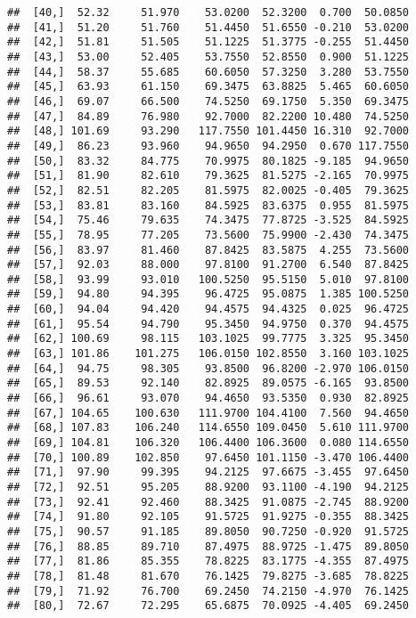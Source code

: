 \documentclass[
]{article}
\begin{document}
\begin{verbatim}
##  [40,]  52.32     51.970    53.0200  52.3200  0.700  50.0850
##  [41,]  51.20     51.760    51.4450  51.6550 -0.210  53.0200
##  [42,]  51.81     51.505    51.1225  51.3775 -0.255  51.4450
##  [43,]  53.00     52.405    53.7550  52.8550  0.900  51.1225
##  [44,]  58.37     55.685    60.6050  57.3250  3.280  53.7550
##  [45,]  63.93     61.150    69.3475  63.8825  5.465  60.6050
##  [46,]  69.07     66.500    74.5250  69.1750  5.350  69.3475
##  [47,]  84.89     76.980    92.7000  82.2200 10.480  74.5250
##  [48,] 101.69     93.290   117.7550 101.4450 16.310  92.7000
##  [49,]  86.23     93.960    94.9650  94.2950  0.670 117.7550
##  [50,]  83.32     84.775    70.9975  80.1825 -9.185  94.9650
##  [51,]  81.90     82.610    79.3625  81.5275 -2.165  70.9975
##  [52,]  82.51     82.205    81.5975  82.0025 -0.405  79.3625
##  [53,]  83.81     83.160    84.5925  83.6375  0.955  81.5975
##  [54,]  75.46     79.635    74.3475  77.8725 -3.525  84.5925
##  [55,]  78.95     77.205    73.5600  75.9900 -2.430  74.3475
##  [56,]  83.97     81.460    87.8425  83.5875  4.255  73.5600
##  [57,]  92.03     88.000    97.8100  91.2700  6.540  87.8425
##  [58,]  93.99     93.010   100.5250  95.5150  5.010  97.8100
##  [59,]  94.80     94.395    96.4725  95.0875  1.385 100.5250
##  [60,]  94.04     94.420    94.4575  94.4325  0.025  96.4725
##  [61,]  95.54     94.790    95.3450  94.9750  0.370  94.4575
##  [62,] 100.69     98.115   103.1025  99.7775  3.325  95.3450
##  [63,] 101.86    101.275   106.0150 102.8550  3.160 103.1025
##  [64,]  94.75     98.305    93.8500  96.8200 -2.970 106.0150
##  [65,]  89.53     92.140    82.8925  89.0575 -6.165  93.8500
##  [66,]  96.61     93.070    94.4650  93.5350  0.930  82.8925
##  [67,] 104.65    100.630   111.9700 104.4100  7.560  94.4650
##  [68,] 107.83    106.240   114.6550 109.0450  5.610 111.9700
##  [69,] 104.81    106.320   106.4400 106.3600  0.080 114.6550
##  [70,] 100.89    102.850    97.6450 101.1150 -3.470 106.4400
##  [71,]  97.90     99.395    94.2125  97.6675 -3.455  97.6450
##  [72,]  92.51     95.205    88.9200  93.1100 -4.190  94.2125
##  [73,]  92.41     92.460    88.3425  91.0875 -2.745  88.9200
##  [74,]  91.80     92.105    91.5725  91.9275 -0.355  88.3425
##  [75,]  90.57     91.185    89.8050  90.7250 -0.920  91.5725
##  [76,]  88.85     89.710    87.4975  88.9725 -1.475  89.8050
##  [77,]  81.86     85.355    78.8225  83.1775 -4.355  87.4975
##  [78,]  81.48     81.670    76.1425  79.8275 -3.685  78.8225
##  [79,]  71.92     76.700    69.2450  74.2150 -4.970  76.1425
##  [80,]  72.67     72.295    65.6875  70.0925 -4.405  69.2450

\end{verbatim}
\end{document}
